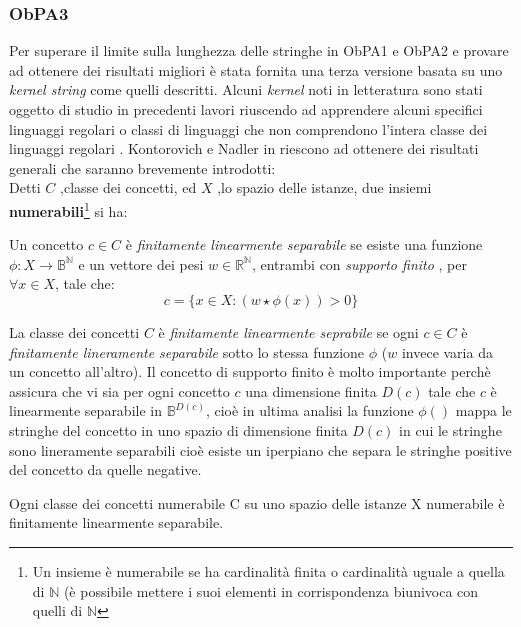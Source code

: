 \subsubsection{ObPA3}
Per superare il limite sulla lunghezza delle stringhe in \ac{ObPA}1 e \ac{ObPA}2 e provare ad ottenere dei risultati migliori è stata fornita una terza versione basata su uno \textit{kernel string} come quelli descritti. Alcuni  \textit{kernel} noti in letteratura sono stati oggetto di studio in precedenti lavori riuscendo ad apprendere alcuni specifici linguaggi regolari o classi di linguaggi che non comprendono l'intera classe dei linguaggi regolari \cite{Clark11}\cite{Clark06}. Kontorovich e Nadler in \cite{Kontorovich09} riescono ad ottenere dei risultati generali che saranno brevemente introdotti:\\
Detti $C$ ,classe dei concetti, ed $X$ ,lo spazio delle istanze, due insiemi \textbf{numerabili}\footnote{Un insieme è numerabile se ha cardinalità finita o cardinalità uguale a quella di $\mathbb{N}$ (è possibile mettere i suoi elementi in corrispondenza biunivoca con quelli di $\mathbb{N}$} si ha:
\begin{definizione*} Un concetto $c \in C$ è \textit{finitamente linearmente separabile} se esiste una funzione $\phi : X \to \mathbb{B}^{\mathbb{N}}$ e un vettore dei pesi $w \in \mathbb{R}^{\mathbb{N}}$, entrambi con \textit{supporto finito} , per $\forall x\in X$, tale che: 
\begin{equation*}
c = \{x \in X :  (w \star \phi(x))  > 0\}
\end{equation*}

\end{definizione*}
La classe dei concetti $C$ è \textit{finitamente linearmente seprabile} se ogni $c \in C$ è \textit{finitamente lineramente separabile} sotto lo stessa funzione $\phi$ ($w$ invece varia da un concetto all'altro). Il concetto di supporto finito è molto importante perchè assicura che vi sia per ogni concetto $c$ una dimensione finita $D(c)$ tale che $c$ è linearmente separabile in $\mathbb{B}^{D(c)}$, cioè in ultima analisi la funzione $\phi()$ mappa le stringhe del concetto in uno spazio di dimensione finita $D(c)$ in cui le stringhe sono lineramente separabili cioè esiste un iperpiano che separa le stringhe positive del concetto da quelle negative.
\begin{teorema}
Ogni classe dei concetti numerabile C su uno spazio delle istanze X numerabile è finitamente linearmente separabile. 
\end{teorema}
